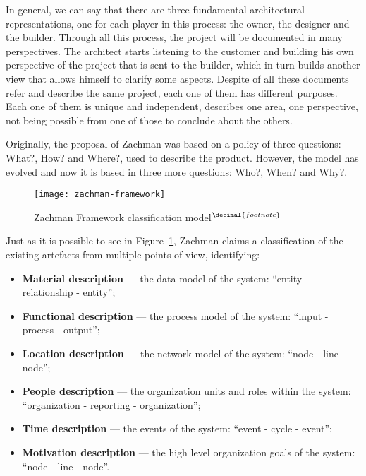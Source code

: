 In general, we can say that there are three fundamental architectural representations, one for each player in this process: the owner, the designer and the builder. Through all this process, the project will be documented in many perspectives. The architect starts listening to the customer and building his own perspective of the project that is sent to the builder, which in turn builds another view that allows himself to clarify some aspects. Despite of all these documents refer and describe the same project, each one of them has different purposes. Each one of them is unique and independent, describes one area, one perspective, not being possible from one of those to conclude about the others.

Originally, the proposal of Zachman was based on a policy of three questions: What?, How? and Where?, used to describe the product. However, the model has evolved and now it is based in three more questions: Who?, When? and Why?.

\addtocounter{footnote}{1}
\begin{figure}[t]
\centering
\texttt{[image: zachman-framework]}
\caption[Zachman Framework classification model]%
			{Zachman Framework classification model$^{\decimal{footnote}}$}
\label{fig:zachman-architecture}
\end{figure}

Just as it is possible to see in Figure~\ref{fig:zachman-architecture}, Zachman claims a classification of the existing artefacts from multiple points of view, identifying:
\begin{itemize}
\item \textbf{Material description} --- the data model of the system: ``entity - relationship - entity''; 
\item \textbf{Functional description} --- the process model of the system: ``input - process - output'';
\item \textbf{Location description} --- the network model of the system: ``node - line - node'';
\item \textbf{People description} --- the organization units and roles within the system: ``organization - reporting - organization'';
\item \textbf{Time description} --- the events of the system: ``event - cycle - event'';
\item \textbf{Motivation description} --- the high level organization goals of the system: ``node - line - node''.
\end{itemize}

